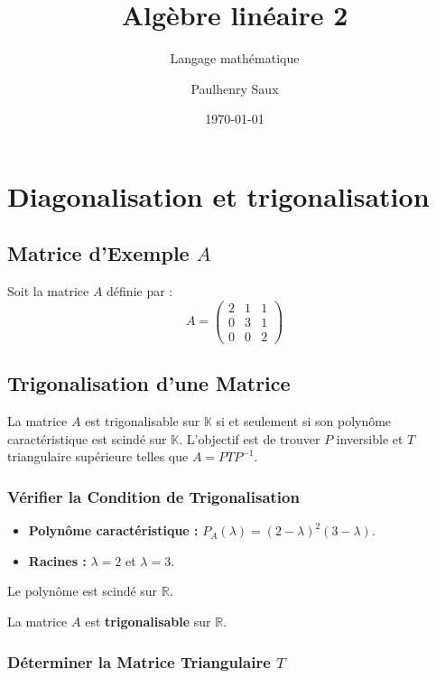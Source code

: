 \documentclass[french]{yLectureNote}
\title{Algèbre linéaire 2}
\subtitle{Langage mathématique}
\author{Paulhenry Saux}
\date{\today}
\begin{document}
\setcounter{chapter}{3}
\chapter{Diagonalisation et trigonalisation}

\section{Matrice d'Exemple $A$}

Soit la matrice $A$ définie par :
$$A = \begin{pmatrix} 2 & 1 & 1 \\ 0 & 3 & 1 \\ 0 & 0 & 2 \end{pmatrix}$$

\section{Trigonalisation d'une Matrice}

La matrice $A$ est trigonalisable sur $\mathbb{K}$ si et seulement si son polynôme caractéristique est scindé sur $\mathbb{K}$. L'objectif est de trouver $P$ inversible et $T$ triangulaire supérieure telles que $A = P T P^{-1}$.

\subsection{Vérifier la Condition de Trigonalisation}
\begin{itemize}
    \item \textbf{Polynôme caractéristique :} $P_A(\lambda) = (2 - \lambda)^2 (3 - \lambda)$.
    \item \textbf{Racines :} $\lambda = 2$ et $\lambda = 3$.
\end{itemize}
Le polynôme est scindé sur $\mathbb{R}$.

La matrice $A$ est \textbf{trigonalisable} sur $\mathbb{R}$.

\subsection{Déterminer la Matrice Triangulaire $T$}
\end{document}
